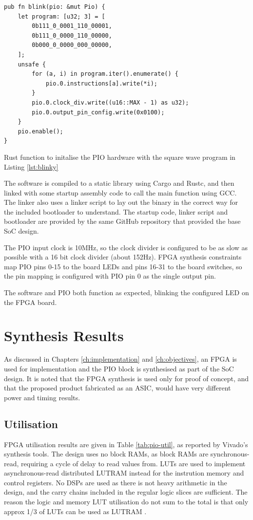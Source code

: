 \begin{listing}[h!]
    \begin{verbatim}
pub fn blink(pio: &mut Pio) {
    let program: [u32; 3] = [
        0b111_0_0001_110_00001,
        0b111_0_0000_110_00000,
        0b000_0_0000_000_00000,
    ];
    unsafe {
        for (a, i) in program.iter().enumerate() {
            pio.0.instructions[a].write(*i);
        }
        pio.0.clock_div.write((u16::MAX - 1) as u32);
        pio.0.output_pin_config.write(0x0100);
    }
    pio.enable();
}
    \end{verbatim}
    \caption{Rust function to initalise the PIO hardware with the square wave program in Listing \ref{lst:blinky}}
    \label{lst:blink-sw}
\end{listing}

The software is compiled to a static library using Cargo and Rustc, and then linked with some startup assembly code to call the main function using GCC. The linker also uses a linker script to lay out the binary in the correct way for the included bootloader to understand. The startup code, linker script and bootloader are provided by the same GitHub repository that provided the base SoC design.

The PIO input clock is 10MHz, so the clock divider is configured to be as slow as possible with a 16 bit clock divider (about 152Hz). FPGA synthesis constraints map PIO pins 0-15 to the board LEDs and pins 16-31 to the board switches, so the pin mapping is configured with PIO pin 0 as the single output pin.

The software and PIO both function as expected, blinking the configured LED on the FPGA board.

\section{Synthesis Results}
As discussed in Chapters \ref{ch:implementation} and \ref{ch:objectives}, an FPGA is used for implementation and the PIO block is synthesised as part of the SoC design. It is noted that the FPGA synthesis is used only for proof of concept, and that the proposed product fabricated as an ASIC, would have very different power and timing results.

\subsection{Utilisation}
\label{sec:synth-res}

FPGA utilisation results are given in Table \ref{tab:pio-util}, as reported by Vivado's synthesis tools. The design uses no block RAMs, as block RAMs are synchronous-read, requiring a cycle of delay to read values from. LUTs are used to implement asynchronous-read distributed LUTRAM instead for the instrution memory and control registers. No DSPs are used as there is not heavy arithmetic in the design, and the carry chains included in the regular logic slices are sufficient. The reason the logic and memory LUT utilisation do not sum to the total is that only approx 1/3 of LUTs can be used as LUTRAM \cite{clb_ug}.

